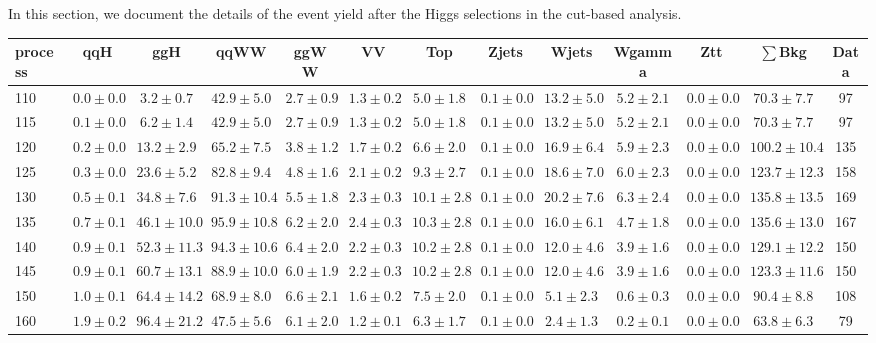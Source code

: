 
In this section, we document the details of the event yield after the Higgs 
selections in the cut-based analysis.

\begin{table}[!htb]
{%
 \tiny
 \begin{center}
 \begin{tabular}{l | c c | c c c c c c c c  | c c}
 \hline
 process & qqH & ggH & qqWW & ggWW & VV & Top & Zjets & Wjets & Wgamma & Ztt & $\sum$Bkg & Data \\
\hline
110 & $0.0\pm0.0$ & $3.2\pm0.7$ & $42.9\pm5.0$ & $2.7\pm0.9$ & $1.3\pm0.2$ & $5.0\pm1.8$ & $0.1\pm0.0$ & $13.2\pm5.0$ & $5.2\pm2.1$ & $0.0\pm0.0$ & $70.3\pm7.7$ & 97 \\
115 & $0.1\pm0.0$ & $6.2\pm1.4$ & $42.9\pm5.0$ & $2.7\pm0.9$ & $1.3\pm0.2$ & $5.0\pm1.8$ & $0.1\pm0.0$ & $13.2\pm5.0$ & $5.2\pm2.1$ & $0.0\pm0.0$ & $70.3\pm7.7$ & 97 \\
120 & $0.2\pm0.0$ & $13.2\pm2.9$ & $65.2\pm7.5$ & $3.8\pm1.2$ & $1.7\pm0.2$ & $6.6\pm2.0$ & $0.1\pm0.0$ & $16.9\pm6.4$ & $5.9\pm2.3$ & $0.0\pm0.0$ & $100.2\pm10.4$ & 135 \\
125 & $0.3\pm0.0$ & $23.6\pm5.2$ & $82.8\pm9.4$ & $4.8\pm1.6$ & $2.1\pm0.2$ & $9.3\pm2.7$ & $0.1\pm0.0$ & $18.6\pm7.0$ & $6.0\pm2.3$ & $0.0\pm0.0$ & $123.7\pm12.3$ & 158 \\
130 & $0.5\pm0.1$ & $34.8\pm7.6$ & $91.3\pm10.4$ & $5.5\pm1.8$ & $2.3\pm0.3$ & $10.1\pm2.8$ & $0.1\pm0.0$ & $20.2\pm7.6$ & $6.3\pm2.4$ & $0.0\pm0.0$ & $135.8\pm13.5$ & 169 \\
135 & $0.7\pm0.1$ & $46.1\pm10.0$ & $95.9\pm10.8$ & $6.2\pm2.0$ & $2.4\pm0.3$ & $10.3\pm2.8$ & $0.1\pm0.0$ & $16.0\pm6.1$ & $4.7\pm1.8$ & $0.0\pm0.0$ & $135.6\pm13.0$ & 167 \\
140 & $0.9\pm0.1$ & $52.3\pm11.3$ & $94.3\pm10.6$ & $6.4\pm2.0$ & $2.2\pm0.3$ & $10.2\pm2.8$ & $0.1\pm0.0$ & $12.0\pm4.6$ & $3.9\pm1.6$ & $0.0\pm0.0$ & $129.1\pm12.2$ & 150 \\
145 & $0.9\pm0.1$ & $60.7\pm13.1$ & $88.9\pm10.0$ & $6.0\pm1.9$ & $2.2\pm0.3$ & $10.2\pm2.8$ & $0.1\pm0.0$ & $12.0\pm4.6$ & $3.9\pm1.6$ & $0.0\pm0.0$ & $123.3\pm11.6$ & 150 \\
150 & $1.0\pm0.1$ & $64.4\pm14.2$ & $68.9\pm8.0$ & $6.6\pm2.1$ & $1.6\pm0.2$ & $7.5\pm2.0$ & $0.1\pm0.0$ & $5.1\pm2.3$ & $0.6\pm0.3$ & $0.0\pm0.0$ & $90.4\pm8.8$ & 108 \\
160 & $1.9\pm0.2$ & $96.4\pm21.2$ & $47.5\pm5.6$ & $6.1\pm2.0$ & $1.2\pm0.1$ & $6.3\pm1.7$ & $0.1\pm0.0$ & $2.4\pm1.3$ & $0.2\pm0.1$ & $0.0\pm0.0$ & $63.8\pm6.3$ & 79 \\

\end{tabular}
\end{center}}
\end{table}

